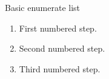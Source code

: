 \documentclass[14pt,t]{beamer-accessibility}
\begin{document}
\begin{frame}{Basic enumerate list}
\begin{enumerate}
\item First numbered step.
\item Second numbered step.
\item Third numbered step.
\end{enumerate}
\end{frame}
\end{document}

